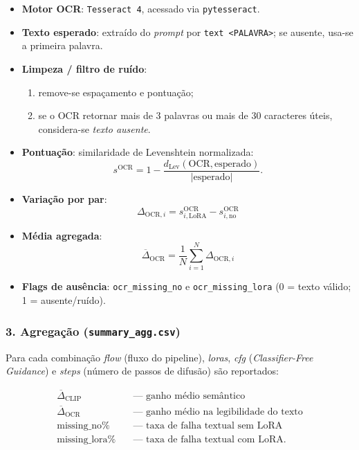 \documentclass[12pt, %
openright, 
oneside, %
a4paper,    %
brazil]{facom-ufu-abntex2}
\begin{document}
\begin{itemize}
  \item \textbf{Motor OCR}: \texttt{Tesseract 4}, acessado via \texttt{pytesseract}.
  \item \textbf{Texto esperado}: extraído do \textit{prompt} por
        \verb|text <PALAVRA>|; se ausente, usa-se a primeira palavra.
  \item \textbf{Limpeza / filtro de ruído}:
        \begin{enumerate}
          \item remove-se espaçamento e pontuação;
          \item se o OCR retornar mais de $3$ palavras ou mais de $30$ caracteres
                úteis, considera-se \emph{texto ausente}.
        \end{enumerate}
  \item \textbf{Pontuação}: similaridade de Levenshtein normalizada:
        \[
          s^{\text{OCR}} = 1 -
            \frac{d_{\text{Lev}}(\text{OCR},\text{esperado})}
                 {|\text{esperado}|}.
        \]
  \item \textbf{Variação por par}:  
        \[
          \boxed{\,
            \Delta_{\text{OCR},i} =
            s^{\text{OCR}}_{i,\text{LoRA}} -
            s^{\text{OCR}}_{i,\text{no}}
          \,}
        \]
  \item \textbf{Média agregada}:  
        \[
          \boxed{\,
            \overline{\Delta}_{\text{OCR}} =
            \frac{1}{N}
            \sum_{i=1}^{N}
            \Delta_{\text{OCR},i}
          \,}
        \]
  \item \textbf{Flags de ausência}:
        \verb|ocr_missing_no| e \verb|ocr_missing_lora| (0 = texto válido; 1 = ausente/ruído).
\end{itemize}

\subsubsection*{3. Agregação (\texttt{summary\_agg.csv})}

Para cada combinação \emph{flow} (fluxo do pipeline), \emph{loras},
\emph{cfg} (\emph{Classifier-Free Guidance}) e \emph{steps}
(número de passos de difusão) são reportados:

\begin{align*}
  \overline{\Delta}_{\text{CLIP}} &\quad\text{— ganho médio semântico} \\
  \overline{\Delta}_{\text{OCR}}  &\quad\text{— ganho médio na legibilidade do texto} \\
  \text{missing\_no\%}           &\quad\text{— taxa de falha textual sem LoRA} \\
  \text{missing\_lora\%}         &\quad\text{— taxa de falha textual com LoRA}.
\end{align*}
\end{document}
